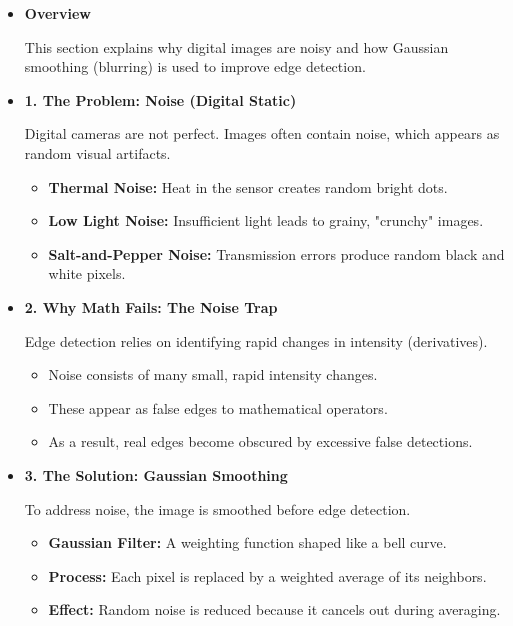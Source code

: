 \documentclass[12pt]{article}
\begin{document}
\begin{itemize}

    \item \textbf{Overview}

          This section explains why digital images are noisy and how Gaussian smoothing (blurring) is used to improve edge detection.

    \item \textbf{1. The Problem: Noise (Digital Static)}

          Digital cameras are not perfect. Images often contain noise, which appears as random visual artifacts.

          \begin{itemize}
              \item \textbf{Thermal Noise:} Heat in the sensor creates random bright dots.
              \item \textbf{Low Light Noise:} Insufficient light leads to grainy, "crunchy" images.
              \item \textbf{Salt-and-Pepper Noise:} Transmission errors produce random black and white pixels.
          \end{itemize}

    \item \textbf{2. Why Math Fails: The Noise Trap}

          Edge detection relies on identifying rapid changes in intensity (derivatives).

          \begin{itemize}
              \item Noise consists of many small, rapid intensity changes.
              \item These appear as false edges to mathematical operators.
              \item As a result, real edges become obscured by excessive false detections.
          \end{itemize}

    \item \textbf{3. The Solution: Gaussian Smoothing}

          To address noise, the image is smoothed before edge detection.

          \begin{itemize}
              \item \textbf{Gaussian Filter:} A weighting function shaped like a bell curve.
              \item \textbf{Process:} Each pixel is replaced by a weighted average of its neighbors.
              \item \textbf{Effect:} Random noise is reduced because it cancels out during averaging.
          \end{itemize}


\end{itemize}
\end{document}
